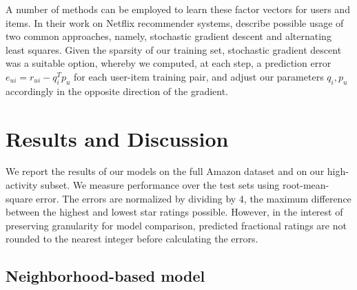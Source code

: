 \documentclass[letterpaper, 11 pt, conference]{ieeeconf}
\begin{document}
A number of methods can be employed to learn these factor vectors for
users and items. In their work on Netflix recommender systems,
\cite{bib:bellkor} describe possible usage of two common approaches, namely,
stochastic gradient descent and alternating least squares. Given the
sparsity of our training set, stochastic gradient descent was a suitable
option, whereby we computed, at each step, a prediction error $e_{ui}
=r_{ui}-q_i^Tp_u$ for each user-item training pair, and adjust our
parameters $q_i,p_u$ accordingly in the opposite direction of the gradient.


\section{Results and Discussion}
\label{sec:results}

We report the results of our models on the full Amazon dataset and on our 
high-activity subset. We measure performance over the test sets using 
root-mean-square error. The errors are normalized by dividing by 4, the maximum 
difference between the highest and lowest star ratings possible. However, 
in the interest of preserving granularity for model comparison, predicted
fractional ratings are not rounded to the nearest integer before calculating 
the errors. 

\subsection{Neighborhood-based model}
\end{document}
